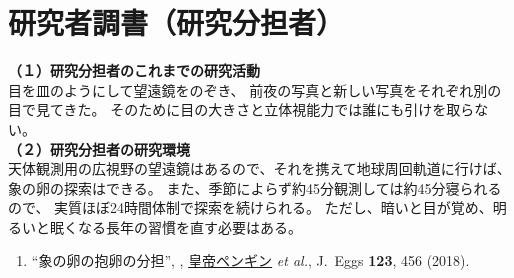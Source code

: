 
\section{研究者調書（研究分担者）}

\renewcommand{\研究者氏名}{朝永振一郎}
\renewcommand{\研究者氏名ふりがな}{ともなが　しんいちろう}
\renewcommand{\研究者生年月日の年}{1900}
\renewcommand{\研究者生年月日の月}{4}
\renewcommand{\研究者生年月日の日}{31}
\renewcommand{\研究者年齢}{137}
\renewcommand{\研究者所属機関部局職}{\small{江戸文理大学・理学部・名誉教授}}	%
\renewcommand{\研究者学位}{理学博士}


\PapersInstructions	%
	\noindent
	\textbf{（１）研究分担者のこれまでの研究活動}\\
	目を皿のようにして望遠鏡をのぞき、
	前夜の写真と新しい写真をそれぞれ別の目で見てきた。
	そのために目の大きさと立体視能力では誰にも引けを取らない。
\\

	\noindent
	\textbf{（２）研究分担者の研究環境}\\
	天体観測用の広視野の望遠鏡はあるので、それを携えて地球周回軌道に行けば、
	象の卵の探索はできる。
	また、季節によらず約45分観測しては約45分寝られるので、
	実質ほぼ24時間体制で探索を続けられる。
	ただし、暗いと目が覚め、明るいと眠くなる長年の習慣を直す必要はある。

	\begin{enumerate}
			{\me}{Astrophysics}{1234}{5678}{2019}
			\label{pub:supernova}	%
			
		\item \label{pub:share} ``象の卵の抱卵の分担'',
				\me, 
				\underline{皇帝ペンギン} {\it et al.},
				J.\ Eggs {\bf 123}, 456 (2018).
					
	\end{enumerate}



